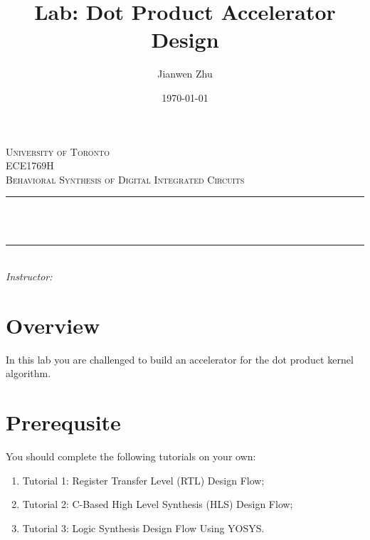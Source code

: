 \documentclass[12pt]{article}
\title{Lab: Dot Product Accelerator Design}			%
\author{Jianwen Zhu}						%
\date{\today}							%
\makeatletter
\newcommand{\course} {ECE1769H}
\let\thetitle\@title
\let\theauthor\@author
\makeatother
\begin{document}

\begin{titlepage}
	\centering
    \vspace*{0.5 cm}
    \textsc{\LARGE University of Toronto}\\[2.0 cm]	%
	\textsc{\Large \course}\\[0.5 cm]				%
	\textsc{\large Behavioral Synthesis of Digital Integrated Circuits}\\[0.5 cm]				%
	\rule{\linewidth}{0.2 mm} \\[0.4 cm]
	{ \huge \bfseries \thetitle}\\
	\rule{\linewidth}{0.2 mm} \\[1.5 cm]
	
		\large
			\emph{Instructor:}\\
			\theauthor 
			
 
	\vfill
	
\end{titlepage}

\pagebreak


\section{Overview}

In this lab you are challenged to build an accelerator for
the dot product kernel algorithm.

\section{Prerequsite}

You should complete the following tutorials on your own:

\begin{enumerate}
  \item Tutorial 1: Register Transfer Level (RTL) Design Flow;
  \item Tutorial 2: C-Based High Level Synthesis (HLS) Design Flow;
  \item Tutorial 3: Logic Synthesis Design Flow Using YOSYS.
\end{enumerate}
\end{document}
